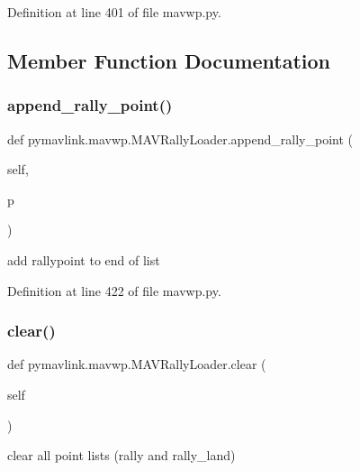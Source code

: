Definition at line 401 of file mavwp.\+py.



\subsection{Member Function Documentation}
\mbox{\label{classpymavlink_1_1mavwp_1_1MAVRallyLoader_a1ba9e108ed71efde9f721482f713f971}} 
\subsubsection{\texorpdfstring{append\_rally\_point()}{append\_rally\_point()}}
{\footnotesize\ttfamily def pymavlink.\+mavwp.\+M\+A\+V\+Rally\+Loader.\+append\+\_\+rally\+\_\+point (\begin{DoxyParamCaption}\item[{}]{self,  }\item[{}]{p }\end{DoxyParamCaption})}

\begin{DoxyVerb}add rallypoint to end of list\end{DoxyVerb}
 

Definition at line 422 of file mavwp.\+py.

\mbox{\label{classpymavlink_1_1mavwp_1_1MAVRallyLoader_a7dced4f8b93c4dd55993fb889c65cf25}} 
\subsubsection{\texorpdfstring{clear()}{clear()}}
{\footnotesize\ttfamily def pymavlink.\+mavwp.\+M\+A\+V\+Rally\+Loader.\+clear (\begin{DoxyParamCaption}\item[{}]{self }\end{DoxyParamCaption})}

\begin{DoxyVerb}clear all point lists (rally and rally_land)\end{DoxyVerb}
 

